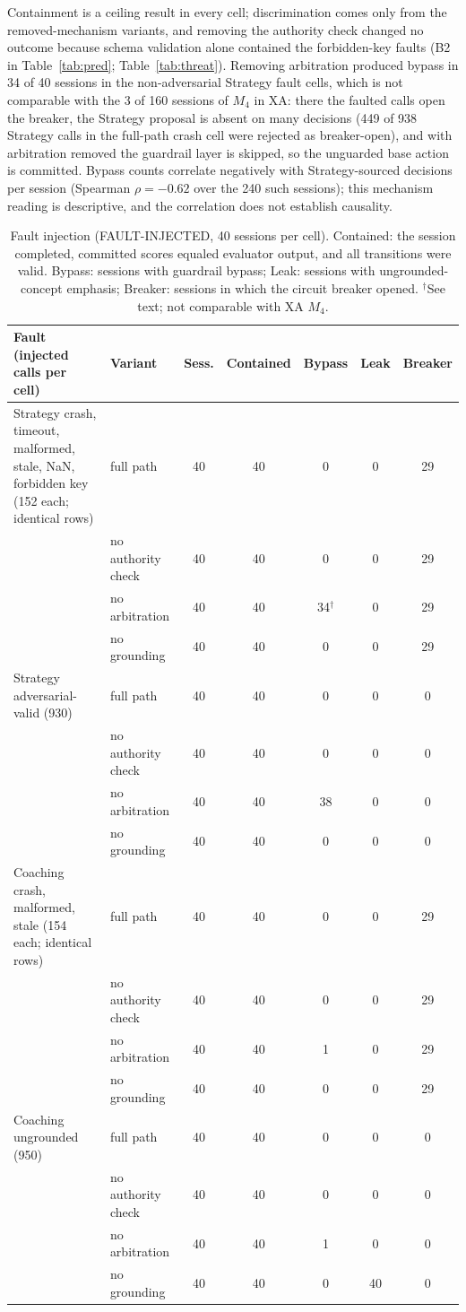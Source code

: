 \documentclass[runningheads,a4paper]{llncs}
\begin{document}
Containment is a ceiling result in every cell; discrimination comes only from the removed-mechanism variants, and removing the authority check changed no outcome because schema validation alone contained the forbidden-key faults (B2 in Table~\ref{tab:pred}; Table~\ref{tab:threat}). Removing arbitration produced bypass in 34 of 40 sessions in the non-adversarial Strategy fault cells, which is not comparable with the 3 of 160 sessions of $M_4$ in XA: there the faulted calls open the breaker, the Strategy proposal is absent on many decisions (449 of 938 Strategy calls in the full-path crash cell were rejected as breaker-open), and with arbitration removed the guardrail layer is skipped, so the unguarded base action is committed. Bypass counts correlate negatively with Strategy-sourced decisions per session (Spearman $\rho=-0.62$ over the 240 such sessions); this mechanism reading is descriptive, and the correlation does not establish causality.

\begin{table}[!htbp]
\caption{Fault injection (FAULT-INJECTED, 40 sessions per cell). Contained: the session completed, committed scores equaled evaluator output, and all transitions were valid. Bypass: sessions with guardrail bypass; Leak: sessions with ungrounded-concept emphasis; Breaker: sessions in which the circuit breaker opened. $^\dagger$See text; not comparable with XA $M_4$.}
\label{tab:xb}
\centering\scriptsize
\begin{tabular}{@{}L{4.0cm}lccccc@{}}
\toprule
Fault (injected calls per cell) & Variant & Sess. & Contained & Bypass & Leak & Breaker\\
\midrule
Strategy crash, timeout, malformed, stale, NaN, forbidden key (152 each; identical rows) & full path & 40&40&0&0&29\\
 & no authority check & 40&40&0&0&29\\
 & no arbitration & 40&40&34$^\dagger$&0&29\\
 & no grounding & 40&40&0&0&29\\
\midrule
Strategy adversarial-valid (930) & full path & 40&40&0&0&0\\
 & no authority check & 40&40&0&0&0\\
 & no arbitration & 40&40&38&0&0\\
 & no grounding & 40&40&0&0&0\\
\midrule
Coaching crash, malformed, stale (154 each; identical rows) & full path & 40&40&0&0&29\\
 & no authority check & 40&40&0&0&29\\
 & no arbitration & 40&40&1&0&29\\
 & no grounding & 40&40&0&0&29\\
\midrule
Coaching ungrounded (950) & full path & 40&40&0&0&0\\
 & no authority check & 40&40&0&0&0\\
 & no arbitration & 40&40&1&0&0\\
 & no grounding & 40&40&0&40&0\\
\bottomrule
\end{tabular}
\end{table}
\end{document}
